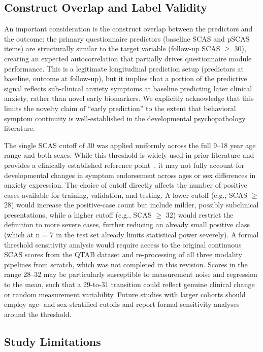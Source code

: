 \documentclass[10pt,letterpaper]{article}
\begin{document}
\subsection*{Construct Overlap and Label Validity}

An important consideration is the construct overlap between the predictors and the outcome: the primary questionnaire predictors (baseline SCAS and pSCAS items) are structurally similar to the target variable (follow-up SCAS $\geq$ 30), creating an expected autocorrelation that partially drives questionnaire module performance. This is a legitimate longitudinal prediction setup (predictors at baseline, outcome at follow-up), but it implies that a portion of the predictive signal reflects sub-clinical anxiety symptoms at baseline predicting later clinical anxiety, rather than novel early biomarkers. We explicitly acknowledge that this limits the novelty claim of ``early prediction'' to the extent that behavioral symptom continuity is well-established in the developmental psychopathology literature.

The single SCAS cutoff of 30 was applied uniformly across the full 9--18 year age range and both sexes. While this threshold is widely used in prior literature and provides a clinically established reference point~\cite{ref35}, it may not fully account for developmental changes in symptom endorsement across ages or sex differences in anxiety expression. The choice of cutoff directly affects the number of positive cases available for training, validation, and testing. A lower cutoff (e.g., SCAS $\geq$ 28) would increase the positive-case count but include milder, possibly subclinical presentations, while a higher cutoff (e.g., SCAS $\geq$ 32) would restrict the definition to more severe cases, further reducing an already small positive class (which at n = 7 in the test set already limits statistical power severely). A formal threshold sensitivity analysis would require access to the original continuous SCAS scores from the QTAB dataset and re-processing of all three modality pipelines from scratch, which was not completed in this revision. Scores in the range 28--32 may be particularly susceptible to measurement noise and regression to the mean, such that a 29-to-31 transition could reflect genuine clinical change or random measurement variability. Future studies with larger cohorts should employ age- and sex-stratified cutoffs and report formal sensitivity analyses around the threshold.

\subsection*{Study Limitations}
\end{document}
